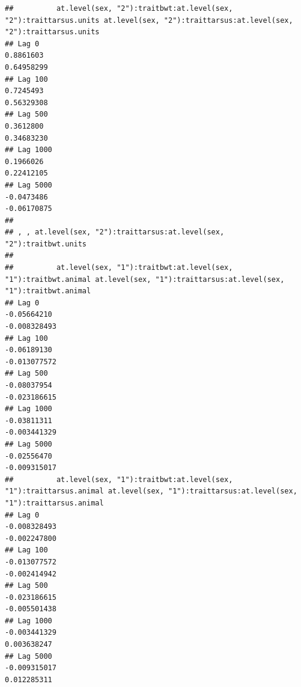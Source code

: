 \documentclass[
  12pt,
]{book}
\begin{document}
\begin{verbatim}
##          at.level(sex, "2"):traitbwt:at.level(sex, "2"):traittarsus.units at.level(sex, "2"):traittarsus:at.level(sex, "2"):traittarsus.units
## Lag 0                                                           0.8861603                                                          0.64958299
## Lag 100                                                         0.7245493                                                          0.56329308
## Lag 500                                                         0.3612800                                                          0.34683230
## Lag 1000                                                        0.1966026                                                          0.22412105
## Lag 5000                                                       -0.0473486                                                         -0.06170875
## 
## , , at.level(sex, "2"):traittarsus:at.level(sex, "2"):traitbwt.units
## 
##          at.level(sex, "1"):traitbwt:at.level(sex, "1"):traitbwt.animal at.level(sex, "1"):traittarsus:at.level(sex, "1"):traitbwt.animal
## Lag 0                                                       -0.05664210                                                      -0.008328493
## Lag 100                                                     -0.06189130                                                      -0.013077572
## Lag 500                                                     -0.08037954                                                      -0.023186615
## Lag 1000                                                    -0.03811311                                                      -0.003441329
## Lag 5000                                                    -0.02556470                                                      -0.009315017
##          at.level(sex, "1"):traitbwt:at.level(sex, "1"):traittarsus.animal at.level(sex, "1"):traittarsus:at.level(sex, "1"):traittarsus.animal
## Lag 0                                                         -0.008328493                                                         -0.002247800
## Lag 100                                                       -0.013077572                                                         -0.002414942
## Lag 500                                                       -0.023186615                                                         -0.005501438
## Lag 1000                                                      -0.003441329                                                          0.003638247
## Lag 5000                                                      -0.009315017                                                          0.012285311

\end{verbatim}
\end{document}
